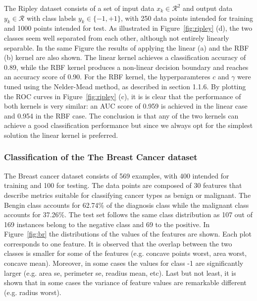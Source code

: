 \documentclass{article}
\begin{document}
The Ripley dataset consists of a set of input data $x_k \in \mathcal{R}^2 $ and output data $y_k \in \mathcal{R} $ with class labels $y_k \in \{-1,+1 \}$, with 250 data points intended for training and 1000 points intended for test. As illustrated in Figure~\ref{fig:ripley} (d), the two classes seem well separated from each other, although not entirely linearly separable. In the same Figure the results of applying the linear (a) and the RBF (b) kernel are also shown. The linear kernel achieves a classification accuracy of 0.89, while the RBF kernel produces a non-linear decision boundary and reaches an accuracy score of 0.90. For the RBF kernel, the hyperparamteres $c$ and $\gamma$ were tuned using the Nelder-Mead method, as described in section 1.1.6. By plotting the ROC curves in Figure~\ref{fig:ripley} (c), it is is clear that the performance of both kernels is very similar: an AUC score of 0.959 is achieved in the linear case and 0.954 in the RBF case. The conclusion is that any of the two kernels can achieve a good classification performance but since we always opt for the simplest solution the linear kernel is preferred. 


\subsubsection{Classification of the The Breast Cancer dataset}

The Breast cancer dataset consists of 569 examples, with 400 intended for training and 100 for testing. The data points are composed of 30 features that describe metrics suitable for classifying cancer types as benign or malignant. The Bengin class accounts for 62.74\% of the diagnosis class while the malignant class accounts for 37.26\%. The test set follows the same class distribution as 107 out of 169 instances belong to the negative class and 69 to the positive. In Figure~\ref{fig:br} the distributions of the values of the features are shown. Each plot corresponds to one feature. It is observed that the overlap between the two classes is smaller for some of the features (e.g. concave points worst, area worst, concave mean). Moreover, in some cases the values for class -1 are significantly larger (e.g. area se, perimeter se, readius mean, etc). Last but not least, it is shown that in some cases the variance of feature values are remarkable different (e.g. radius worst).
\end{document}
